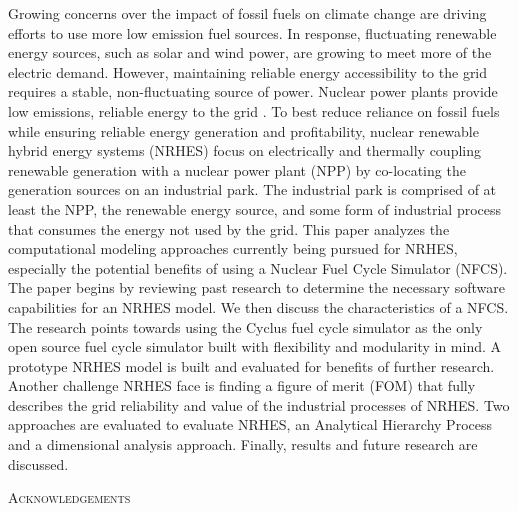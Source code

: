 \documentclass[12pt]{UIdahoMastersThesis}
\begin{document}
Growing concerns over the impact of fossil fuels on climate change are driving efforts to use more low emission fuel sources. In response, fluctuating renewable energy sources, such as solar and wind power, are growing to meet more of the electric demand. However, maintaining reliable energy accessibility to the grid requires a stable, non-fluctuating source of power. Nuclear power plants provide low emissions, reliable energy to the grid \cite{IPCC}. To best reduce reliance on fossil fuels while ensuring reliable energy generation and profitability, nuclear renewable hybrid energy systems (NRHES) focus on electrically and thermally coupling renewable generation with a nuclear power plant (NPP) by co-locating the generation sources on an industrial park. The industrial park is comprised of at least the NPP, the renewable energy source, and some form of industrial process that consumes the energy not used by the grid.
This paper analyzes the computational modeling approaches currently being pursued for NRHES, especially the potential benefits of using a Nuclear Fuel Cycle Simulator (NFCS). The paper begins by reviewing past research to determine the necessary software capabilities for an NRHES model. We then discuss the characteristics of a NFCS. The research points towards using the Cyclus fuel cycle simulator as the only open source fuel cycle simulator built with flexibility and modularity in mind. A prototype NRHES model is built and evaluated for benefits of further research. Another challenge NRHES face is finding a figure of merit (FOM) that fully describes the grid reliability and value of the industrial processes of NRHES. Two approaches are evaluated to evaluate NRHES, an Analytical Hierarchy Process and a dimensional analysis approach.  Finally, results and future research are discussed.

\newpage


 \begin{center}
 	{\LARGE\textsc{Acknowledgements}}
 \end{center}


\newpage


\end{document}
